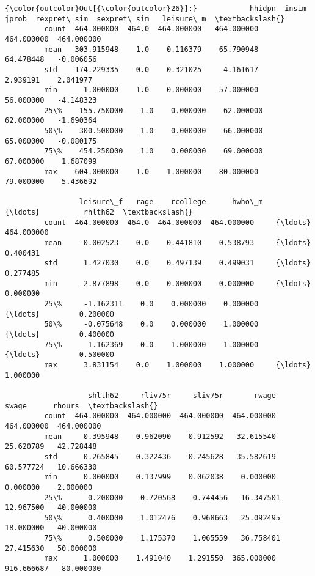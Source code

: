 \documentclass[11pt]{article}
\begin{document}
\begin{Verbatim}[commandchars=\\\{\}]
{\color{outcolor}Out[{\color{outcolor}26}]:}            hhidpn  insim       jprob  rexpret\_sim  sexpret\_sim   leisure\_m  \textbackslash{}
         count  464.000000  464.0  464.000000   464.000000   464.000000  464.000000   
         mean   303.915948    1.0    0.116379    65.790948    64.478448   -0.006056   
         std    174.229335    0.0    0.321025     4.161617     2.939191    2.041977   
         min      1.000000    1.0    0.000000    57.000000    56.000000   -4.148323   
         25\%    155.750000    1.0    0.000000    62.000000    62.000000   -1.690364   
         50\%    300.500000    1.0    0.000000    66.000000    65.000000   -0.080175   
         75\%    454.250000    1.0    0.000000    69.000000    67.000000    1.687099   
         max    604.000000    1.0    1.000000    80.000000    79.000000    5.436692   
         
                 leisure\_f   rage    rcollege      hwho\_m     {\ldots}          rhlth62  \textbackslash{}
         count  464.000000  464.0  464.000000  464.000000     {\ldots}       464.000000   
         mean    -0.002523    0.0    0.441810    0.538793     {\ldots}         0.400431   
         std      1.427030    0.0    0.497139    0.499031     {\ldots}         0.277485   
         min     -2.877898    0.0    0.000000    0.000000     {\ldots}         0.000000   
         25\%     -1.162311    0.0    0.000000    0.000000     {\ldots}         0.200000   
         50\%     -0.075648    0.0    0.000000    1.000000     {\ldots}         0.400000   
         75\%      1.162369    0.0    1.000000    1.000000     {\ldots}         0.500000   
         max      3.831154    0.0    1.000000    1.000000     {\ldots}         1.000000   
         
                   shlth62     rliv75r     sliv75r       rwage       swage      rhours  \textbackslash{}
         count  464.000000  464.000000  464.000000  464.000000  464.000000  464.000000   
         mean     0.395948    0.962090    0.912592   32.615540   25.620789   42.728448   
         std      0.265845    0.322436    0.245628   35.582619   60.577724   10.666330   
         min      0.000000    0.137999    0.062038    0.000000    0.000000    2.000000   
         25\%      0.200000    0.720568    0.744456   16.347501   12.967500   40.000000   
         50\%      0.400000    1.012476    0.968663   25.092495   18.000000   40.000000   
         75\%      0.500000    1.175370    1.065559   36.758401   27.415630   50.000000   
         max      1.000000    1.491040    1.291550  365.000000  916.666687   80.000000   
         

\end{Verbatim}
\end{document}
